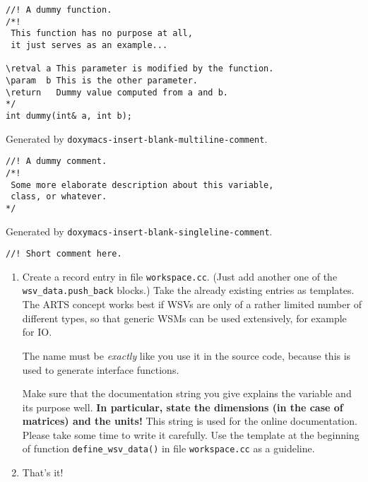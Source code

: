 \begin{verbatim}
//! A dummy function.
/*! 
 This function has no purpose at all,
 it just serves as an example... 

\retval a This parameter is modified by the function.
\param  b This is the other parameter.         
\return   Dummy value computed from a and b.         
*/
int dummy(int& a, int b);
\end{verbatim}


Generated by \verb|doxymacs-insert-blank-multiline-comment|.

\begin{verbatim}
//! A dummy comment.
/*! 
 Some more elaborate description about this variable, 
 class, or whatever. 
*/
\end{verbatim}


Generated by \verb|doxymacs-insert-blank-singleline-comment|.

\begin{verbatim}
//! Short comment here.
\end{verbatim}


 \label{sec:development:extending}

\begin{enumerate}
\item Create a record entry in file \verb|workspace.cc|. (Just add
  another one of the \verb|wsv_data.push_back| blocks.) Take the
  already existing entries as templates. The ARTS concept works best
  if WSVs are only of a rather limited number of different types, so
  that generic WSMs can be used extensively, for example for IO.
      
  The name must be \emph{exactly} like you use it in the source code,
  because this is used to generate interface functions.
  
  Make sure that the documentation string you give explains the
  variable and its purpose well. \textbf{In particular, state the
    dimensions (in the case of matrices) and the units!} This string
  is used for the online documentation. Please take some time to write
  it carefully. Use the template at the beginning of function
  \verb|define_wsv_data()| in file \verb|workspace.cc| as a
  guideline. 

\item That's it!
\end{enumerate}


